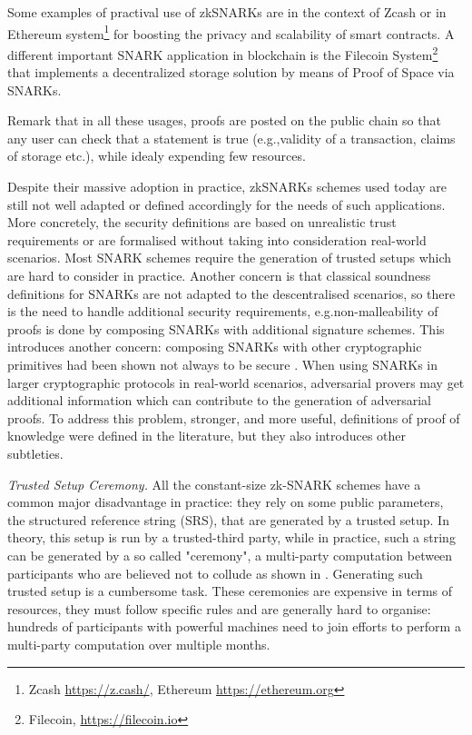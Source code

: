 Some examples of practival use of zkSNARKs are in the context of Zcash or in Ethereum system\footnote{Zcash \url{https://z.cash/}, Ethereum \url{https://ethereum.org}} for boosting the privacy and scalability of smart contracts. 
A different important SNARK application in blockchain is the Filecoin System\footnote{Filecoin,  \url{https://filecoin.io}} that implements a decentralized storage solution by means of Proof of Space via SNARKs. 

Remark that in all these usages, proofs are posted on the public chain so that any user 
can check that a statement is true (e.g.,validity of a transaction, claims of storage etc.), while idealy expending few resources.

Despite their massive adoption in practice,  zkSNARKs schemes used today are still not well adapted or defined accordingly for the needs of such applications. 
More concretely,  the security definitions are based on unrealistic trust requirements or are formalised without taking into consideration real-world scenarios. 
Most SNARK schemes require the generation of trusted setups which are hard to consider in practice.  Another concern is that classical soundness  definitions for SNARKs are not adapted to the descentralised scenarios, so there is the need to handle additional security requirements, e.g.non-malleability of proofs is done by composing SNARKs with additional signature schemes.  
This introduces another concern: composing SNARKs with other cryptographic primitives had been shown not always to be secure \cite{STOC:BCPR14,TCC:FioNit16}.
When using SNARKs in larger cryptographic protocols in real-world scenarios, 
adversarial provers
may get additional information which can contribute to the generation of adversarial proofs. To address this problem,  stronger, and more useful, definitions
of proof of knowledge were defined in the literature, but they also introduces other
subtleties.

  
\noindent \emph{Trusted Setup Ceremony.} All the  constant-size zk-SNARK schemes have a common major disadvantage in practice:
they rely on some public parameters, the structured reference string (SRS), that are generated by a trusted setup. In theory, this setup is run by a trusted-third party, while in practice, such a string can be generated by a so called "ceremony", a multi-party
computation between participants who are believed not to collude as shown in \cite{AFRICACRYPT:ABLSZ19,EPRINT:BowGabMie17,SP:BCGTV15}.
Generating such trusted setup is a cumbersome task. 
These ceremonies are expensive in terms of resources, they must follow specific rules and are generally hard to organise: hundreds of participants with powerful machines need to join efforts to perform a multi-party computation over multiple months. 



